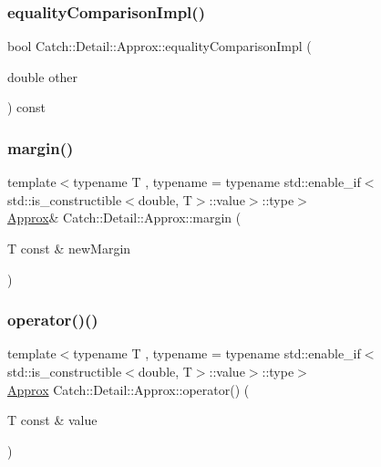 \mbox{\label{class_catch_1_1_detail_1_1_approx_af53c48227a7b654da58adeb1d360b715}} 
\subsubsection{\texorpdfstring{equalityComparisonImpl()}{equalityComparisonImpl()}}
{\footnotesize\ttfamily bool Catch\+::\+Detail\+::\+Approx\+::equality\+Comparison\+Impl (\begin{DoxyParamCaption}\item[{double}]{other }\end{DoxyParamCaption}) const\hspace{0.3cm}{\ttfamily [private]}}

\mbox{\label{class_catch_1_1_detail_1_1_approx_a6467dc18791e1a1f4c15c4fb63cf5051}} 
\subsubsection{\texorpdfstring{margin()}{margin()}}
{\footnotesize\ttfamily template$<$typename T , typename  = typename std\+::enable\+\_\+if$<$std\+::is\+\_\+constructible$<$double, T$>$\+::value$>$\+::type$>$ \\
\mbox{\hyperlink{class_catch_1_1_detail_1_1_approx}{Approx}}\& Catch\+::\+Detail\+::\+Approx\+::margin (\begin{DoxyParamCaption}\item[{T const \&}]{new\+Margin }\end{DoxyParamCaption})\hspace{0.3cm}{\ttfamily [inline]}}

\mbox{\label{class_catch_1_1_detail_1_1_approx_ad8b2757f4804f9a1d3fa674efb98c20e}} 
\subsubsection{\texorpdfstring{operator()()}{operator()()}}
{\footnotesize\ttfamily template$<$typename T , typename  = typename std\+::enable\+\_\+if$<$std\+::is\+\_\+constructible$<$double, T$>$\+::value$>$\+::type$>$ \\
\mbox{\hyperlink{class_catch_1_1_detail_1_1_approx}{Approx}} Catch\+::\+Detail\+::\+Approx\+::operator() (\begin{DoxyParamCaption}\item[{T const \&}]{value }\end{DoxyParamCaption})\hspace{0.3cm}{\ttfamily [inline]}}

